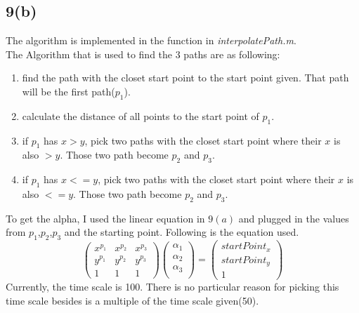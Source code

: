 \documentclass{article}
\begin{document}
\subsection*{9(b)}
The algorithm is implemented in the function in \textit{interpolatePath.m}.\\
The Algorithm that is used to find the 3 paths are as following:
\begin{enumerate}
	\item find the path with the closet start point to the start point given. That path will be the first path($p_1$).
	\item calculate the distance of all points to the start point of $p_1$.
	\item if $p_1$ has $x > y$, pick two paths with the closet start point where their $x$ is also $> y$. Those two path become $p_2$ and $p_3$. 
	\item if $p_1$ has $x <= y$, pick two paths with the closet start point where their $x$ is also $<= y$. Those two path become $p_2$ and $p_3$. 
\end{enumerate}
To get the alpha, I used the linear equation in $9(a)$ and plugged in the values from $p_1$,$p_2$,$p_3$ and the starting point. Following is the equation used.
\begin{equation*}
\begin{pmatrix}
x^{p_1} & x^{p_2} & x^{p_3} \\
y^{p_1} & y^{p_2} & y^{p_3} \\
1 & 1 & 1 
\end{pmatrix}
\begin{pmatrix}
\alpha_1 \\
\alpha_2 \\
\alpha_3 \\ 
\end{pmatrix}
=
\begin{pmatrix}
startPoint_x \\
startPoint_y \\
1 
\end{pmatrix}
\end{equation*}
Currently, the time scale is 100. There is no particular reason for picking this time scale besides is a multiple of the time scale given(50).
\end{document}
